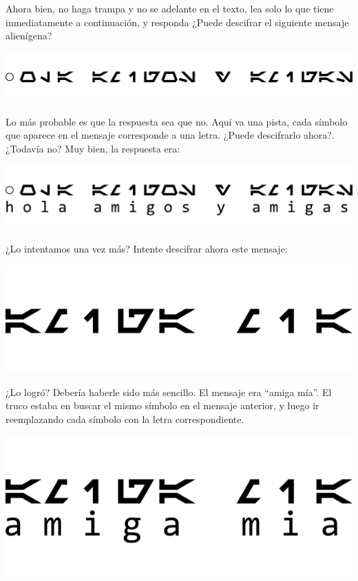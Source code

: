 Ahora bien, no haga trampa y no se adelante en el texto, lea solo lo que tiene
inmediatamente a continuación, y responda ¿Puede descifrar el siguiente mensaje alienígena?

\centerline{\includegraphics[]{capitulos/bajo_nivel/imagenes/secret_message_A1.png}}

Lo más probable es que la respuesta sea que no. Aquí va una pista, cada
símbolo que aparece en el mensaje corresponde a una letra. ¿Puede descifrarlo
ahora?. ¿Todavía no? Muy bien, la respuesta era:

\centerline{\includegraphics[]{capitulos/bajo_nivel/imagenes/secret_message_A2.png}}

¿Lo intentamos una vez más? Intente descifrar ahora este mensaje:

\centerline{\includegraphics[]{capitulos/bajo_nivel/imagenes/secret_message_B1.png}}

¿Lo logró? Debería haberle sido más sencillo. El mensaje era ``amiga mía''. El
truco estaba en buscar el mismo símbolo en el mensaje anterior, y luego ir
reemplazando cada símbolo con la letra correspondiente.

\centerline{\includegraphics[]{capitulos/bajo_nivel/imagenes/secret_message_B2.png}}

